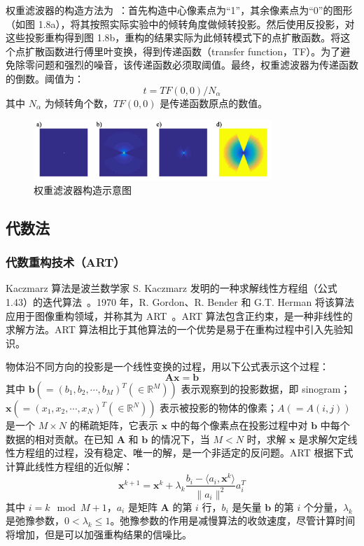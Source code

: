 权重滤波器的构造方法为~\cite{Wolf2014}：首先构造中心像素点为“1”，其余像素点为“0”的图形（如图 1.8a），将其按照实际实验中的倾转角度做倾转投影。然后使用反投影，对这些投影重构得到图 1.8b，重构的结果实际为此倾转模式下的点扩散函数。将这个点扩散函数进行傅里叶变换，得到传递函数（transfer function，TF）。为了避免除零问题和强烈的噪音，该传递函数必须取阈值。最终，权重滤波器为传递函数的倒数。阈值为：
\begin{equation}
t=\textit{TF}(0,0)/N_{\alpha}
\end{equation}
其中 $N_{\alpha}$ 为倾转角个数，$\textit{TF}(0,0)$ 是传递函数原点的数值。
\begin{figure}[htbp]
	\vspace{\baselineskip}
	\centering
	\includegraphics[width=0.8\textwidth]{../1.8/18}
	\caption{权重滤波器构造示意图}\label{fig:18}
	\song{}
\end{figure}

\subsection{代数法}
\subsubsection{代数重构技术（ART）}
Kaczmarz 算法是波兰数学家 S. Kaczmarz 发明的一种求解线性方程组（公式 1.43）的迭代算法~\cite{Kaczmarz1937}。1970 年，R. Gordon、R. Bender 和 G.T. Herman 将该算法应用于图像重构领域，并称其为 ART~\cite{Gordon1970}。ART 算法包含正约束，是一种非线性的求解方法。ART 算法相比于其他算法的一个优势是易于在重构过程中引入先验知识。

物体沿不同方向的投影是一个线性变换的过程，用以下公式表示这个过程：
\begin{equation}
\boldsymbol{Ax=b}
\end{equation}
其中 $\boldsymbol{b}\left(=(b_1,b_2,\cdots,b_M)^T(\in\mathbb{R}^M)\right)$ 表示观察到的投影数据，即  sinogram； $\boldsymbol{x}\left(=(x_1,x_2,\cdots,x_N)^T(\in\mathbb{R}^N)\right)$  表示被投影的物体的像素；$A\left(=A(i,j)\right)$ 是一个 $M\times N$ 的稀疏矩阵，它表示 $\boldsymbol{x}$ 中的每个像素点在投影过程中对 $\boldsymbol{b}$ 中每个数据的相对贡献。在已知 $\boldsymbol{A}$ 和 $\boldsymbol{b}$ 的情况下，当 $M<N$ 时，求解 $\boldsymbol{x}$ 是求解欠定线性方程组的过程，没有稳定、唯一的解，是一个非适定的反问题。ART 根据下式计算此线性方程组的近似解：
\begin{equation}
\boldsymbol{x}^{k+1}=\boldsymbol{x}^k+\lambda_k \frac{b_i-\langle a_i,\boldsymbol{x}^k \rangle}{\| a_i\|^2}a_i^T
\end{equation}
其中 $i=k \mod M+1$，$a_i$ 是矩阵 $\boldsymbol{A}$ 的第 $i$ 行，$b_i$ 是矢量 $\boldsymbol{b}$ 的第 $i$ 个分量，$\lambda_k$ 是弛豫参数，$0<\lambda_k \leq 1$。弛豫参数的作用是减慢算法的收敛速度，尽管计算时间将增加，但是可以加强重构结果的信噪比。

